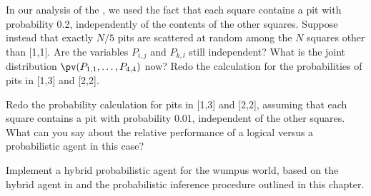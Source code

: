 \begin{exercise}
In our analysis of the , we used the fact that
each square contains a pit with probability 0.2, independently of the
contents of the other squares. Suppose instead that exactly \(N/5\) pits
are scattered  at random among the \(N\) squares other than
[1,1].  Are the variables \(P_{i,j}\) and \(P_{k,l}\) still independent?
What is the joint distribution \(\pv(P_{1,1},\ldots,P_{4,4})\) now?
Redo the calculation for the probabilities of pits in [1,3] and [2,2].
\end{exercise} 

\begin{exercise}
Redo the probability calculation for pits in [1,3] and [2,2], assuming that each
square contains a pit with probability 0.01, independent of the
other squares.  What can you say about the relative performance of a
logical versus a probabilistic agent in this case?
\end{exercise} 

\begin{exercise}
\prgex Implement a hybrid probabilistic agent for the wumpus world, based on the
hybrid agent in  and the probabilistic
inference procedure outlined in this chapter.
\end{exercise} 





